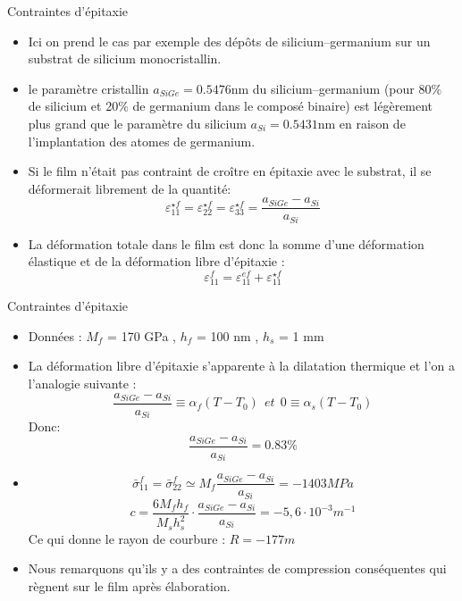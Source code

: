 \begin{frame}{Contraintes d'épitaxie}
    \begin{itemize}
        \item Ici on prend le cas par exemple des dépôts de silicium–germanium sur un substrat de silicium monocristallin.
        \item le paramètre cristallin $a_{SiGe} = 0.5476$nm du silicium–germanium (pour 80$\%$ de silicium et 20$\%$ de germanium dans le composé binaire) est légèrement plus grand que le paramètre du silicium $a_{Si} = 0.5431$nm en raison de l’implantation des atomes de germanium.
        \item Si le film n’était pas contraint de croître en épitaxie avec le substrat, il se déformerait librement de la quantité:
        $$\varepsilon _{11} ^{\star f} = \varepsilon _{22} ^{\star f} = \varepsilon _{33} ^{\star f} = \frac{a_{SiGe}-a_{Si}}{a_{Si}}  $$
        \item La déformation totale dans le film est donc la somme d’une déformation élastique et de la déformation libre d’épitaxie :
        $$\varepsilon _{11} ^{f} = \varepsilon _{11} ^{ef} + \varepsilon _{11} ^{\star f}$$
    \end{itemize}
\end{frame}

\begin{frame}{Contraintes d'épitaxie}
    \begin{itemize}
        \item Données : $M_f$ = 170 GPa , $h_f$ = 100 nm , $h_s$ = 1 mm
        \item La déformation libre d’épitaxie s’apparente à la dilatation thermique et l’on a l’analogie suivante :
        $$\frac{a_{SiGe}-a_{Si}}{a_{Si}} \equiv \alpha _f(T-T_0) ~~ et ~~ 0 \equiv \alpha _s(T-T_0)$$
        Donc: $$\frac{a_{SiGe}-a_{Si}}{a_{Si}} = 0.83\%$$
        \item $$\bar{\sigma}_{11}^{f} = \bar{\sigma}_{22}^{f} \simeq M_f \frac{a_{SiGe}-a_{Si}}{a_{Si}} = -1403MPa$$
        $$c = \frac{6M_fh_f}{M_sh_s^2}\cdot \frac{a_{SiGe}-a_{Si}}{a_{Si}} = -5,6\cdot 10^{-3}m^{-1}$$
        Ce qui donne le rayon de courbure : $R=-177m$
        \item Nous remarquons qu'ils y a des contraintes de compression conséquentes qui règnent sur le film après élaboration.
    \end{itemize}
\end{frame}

